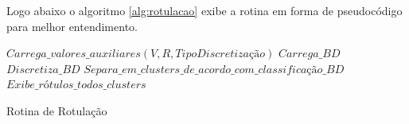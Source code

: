 Logo abaixo o algoritmo \ref{alg:rotulacao} exibe a rotina em forma de pseudocódigo para melhor entendimento.

\IncMargin{1em}
\begin{algorithm}[h]

\nl $Carrega\_valores\_auxiliares(V,R,TipoDiscretização)$\;
\nl $Carrega\_BD$\; 
\nl $Discretiza\_BD$\; 
\nl $Separa\_em\_clusters\_de\_acordo\_com\_classificação\_BD$\; 
\nl {}
 \nl $Exibe\_rótulos\_todos\_clusters$\; 
 \caption{Rotina de Rotulação}\label{alg:rotulacao}
 
\end{algorithm}
\DecMargin{1em}
        
